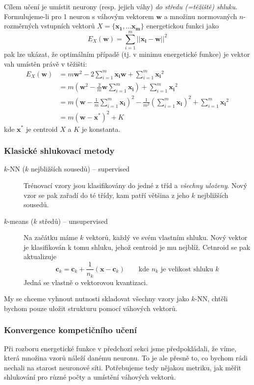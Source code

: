 \documentclass[11pt]{report} %
\renewcommand{\vec}[1]{\mathbf{#1}}
\numberwithin{equation}{section}
\begin{document}
Cílem učení je umístit neurony (resp. jejich váhy) \textit{do středu (=těžiště) shluku}. Formulujeme-li pro 1 neuron s váhovým vektorem $\vec{w}$ a množinu normovaných $n$-rozměrných vstupních vektorů $X = \{\vec{x_1},\dots \vec{x_m} \}$ energetickou funkci jako
$$E_X(\vec{w}) = \sum\limits_{i=1}^{m}||\vec{x_i} - \vec{w}||^2$$
pak lze ukázat, že optimálním případě (tj. v minimu energetické funkce) je vektor vah umístěn právě v těžišti:
\begin{align*}
	E_X(\vec{w}) &= m\vec{w}^2 - 2\sum\limits_{i=1}^{m}\vec{x_i}\vec{w} + \sum\limits_{i=1}^{m} \vec{x_i}^2 \\
	&=m\left(\vec{w}^2 - \frac{2}{m}\vec{w}\sum\limits_{i=1}^{m}\vec{x_i}\right) + \sum\limits_{i=1}^{m} \vec{x_i}^2 \\
	&=m\left(\vec{w} - \frac{1}{m}\sum\limits_{i=1}^{m}\vec{x_i}\right)^2 - \frac{1}{m^2}\left(\sum\limits_{i=1}^{m}\vec{x_i}\right)^2 + \sum\limits_{i=1}^{m} \vec{x_i}^2 \\
	&=m(\vec{w} - \vec{x^*})^2 + K
\end{align*}
kde $\vec{x^*}$ je centroid $X$ a $K$ je konstanta.

\subsubsection{Klasické shlukovací metody}
\begin{description}
	\item[$k$-NN ($k$ nejbližších sousedů) -- supervised] Trénovací vzory jsou klasifikovány do jedné z tříd a \textit{všechny uloženy}. Nový vzor se pak zařadí do té třídy, kam patří většina z jeho $k$ nejbližších sousedů.
	
	\item[$k$-means ($k$ středů) -- unsupervised] Na začátku máme $k$ vektorů, každý ve svém vlastním shluku. Nový vektor je klasifikován k tomu shluku, jehož centroid je mu nejblíž. Cetnroid se pak aktualizuje
	$$\vec{c}_k = \vec{c}_k + \frac{1}{n_k}(\vec{x} - \vec{c}_k)\qquad \text{kde $n_k$ je velikost shluku $k$}$$
	Jedná se vlastně o vektorovou kvantizaci.
\end{description}

My se chceme vyhnout nutnosti skladovat všechny vzory jako $k$-NN, chtěli bychom pouze uložit strukturu pomocí váhových vektorů.


\subsubsection{Konvergence kompetičního učení}
Při rozboru energetické funkce v předchozí sekci jsme předpokládali, že víme, která množina vzorů náleží danému neuronu. To je ale přesně to, co bychom rádi nechali na starost neuronové síti. Potřebujeme tedy nějakou metriku, jak měřit  shlukování pro různé počty a umístění váhových vektorů.
\end{document}
